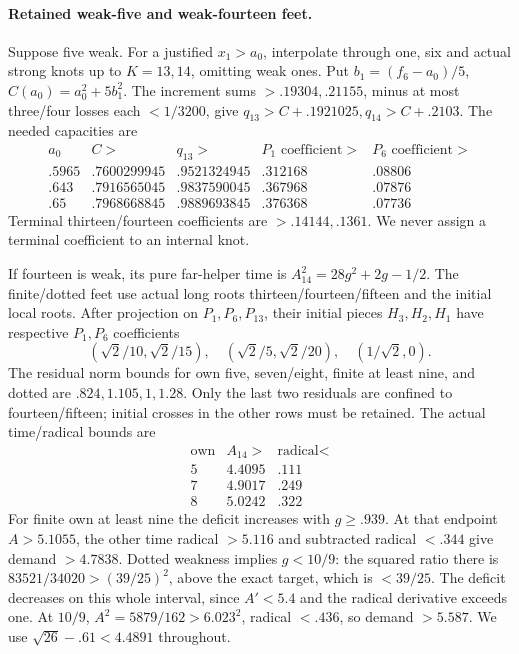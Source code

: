 \documentclass[11pt]{article}
\theoremstyle{definition}
\theoremstyle{remark}
\begin{document}
\paragraph{Retained weak-five and weak-fourteen feet.}
Suppose five weak. For a justified \(x_1>a_0\), interpolate through
one, six and actual strong knots up to \(K=13,14\), omitting weak
ones. Put \(b_1=(f_6-a_0)/5\), \(C(a_0)=a_0^2+5b_1^2\).
The increment sums \(>.19304,.21155\), minus at most three/four
losses each \(<1/3200\), give
\(q_{13}>C+.1921025,q_{14}>C+.2103\). The needed capacities are
\[
\begin{array}{c|c|c|c|c}
a_0&C>&q_{13}>&P_1\text{ coefficient}>&P_6\text{ coefficient}>\\\hline
.5965&.7600299945&.9521324945&.312168&.08806\\
.643&.7916565045&.9837590045&.367968&.07876\\
.65&.7968668845&.9889693845&.376368&.07736
\end{array}
\]
Terminal thirteen/fourteen coefficients are \(>.14144,.1361\).
We never assign a terminal coefficient to an internal knot.

If fourteen is weak, its pure far-helper time is
\(A_{14}^2=28g^2+2g-1/2\). The finite/dotted feet use actual long
roots thirteen/fourteen/fifteen and the initial local roots.
After projection on \(P_1,P_6,P_{13}\), their initial pieces
\(H_3,H_2,H_1\) have respective \(P_1,P_6\) coefficients
\[
 (\sqrt2/10,\sqrt2/15),\quad
 (\sqrt2/5,\sqrt2/20),\quad(1/\sqrt2,0).
\]
The residual norm bounds for own five, seven/eight, finite at least
nine, and dotted are \(.824,1.105,1,1.28\). Only the last two
residuals are confined to fourteen/fifteen; initial crosses in the
other rows must be retained. The actual time/radical bounds are
\[
\begin{array}{c|c|c}
\text{own}&A_{14}>&\text{radical}<\\\hline
5&4.4095&.111\\7&4.9017&.249\\8&5.0242&.322
\end{array}
\]
For finite own at least nine the deficit increases with \(g\ge.939\).
At that endpoint \(A>5.1055\), the other time radical \(>5.116\)
and subtracted radical \(<.344\) give demand \(>4.7838\).
Dotted weakness implies \(g<10/9\): the squared ratio there is
\(83521/34020>(39/25)^2\), above the exact target, which is
\(<39/25\). The deficit decreases on this whole interval, since
\(A'<5.4\) and the radical derivative exceeds one. At \(10/9\),
\(A^2=5879/162>6.023^2\), radical \(<.436\), so demand \(>5.587\).
We use \(\sqrt{26}-.61<4.4891\) throughout.
\end{document}
